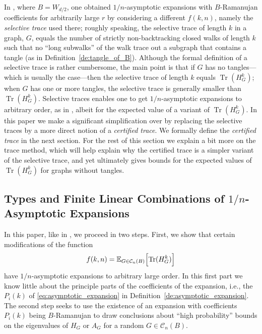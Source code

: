 \documentclass{memo-l}
\theoremstyle{plain}
\theoremstyle{definition}
\numberwithin{section}{chapter}
\numberwithin{equation}{chapter}
\newcommand{\cal}{\mathcal}
\newcommand{\cc}{{\cal C}}
\DeclareMathOperator{\Tr}{Tr}
\theoremstyle{plain}
\theoremstyle{definition}
\newcommand\EE{\mathbb{E}}
\newcommand\cC{\mathcal{C}}
\begin{document}
In \cite{friedman_alon}, 
where $B=W_{d/2}$,
one obtained $1/n$-asymptotic expansions with $B$-Ramanujan coefficients
for arbitrarily large $r$
by considering a different $f(k,n)$, namely the {\em selective trace}
used there; roughly speaking, the selective trace of length $k$
in a graph, $G$, equals the number of strictly non-backtracking closed
walks of length $k$ such that no ``long subwalks'' of the walk trace
out a subgraph that contains a tangle (as in
Definition~\ref{de:tangle_of_B}).
Although the formal definition of a selective trace is rather
cumbersome, the main point is that if $G$ has no tangles---which is
usually the case---then the selective trace of length $k$ equals
$\Tr(H_G^k)$;
when $G$ has one or more tangles,
the selective trace is generally smaller than $\Tr(H_G^k)$.
Selective traces enables
one to get $1/n$-asymptotic expansions to arbitrary order,
as in \cite{friedman_alon}, albeit for the expected value of a
variant of $\Tr(H_G^k)$.
In this paper we make a significant simplification over \cite{friedman_alon}
by replacing the selective traces by a more direct notion of a
{\em certified trace}.
We formally define the {\em certified trace} in the next section.
For the rest of this section we explain a bit more on the trace method,
which will help explain why the certified trace is a simpler variant
of the selective trace, and yet ultimately gives bounds for
the expected values of $\Tr(H_G^k)$ for graphs without tangles.



\subsection{Types and Finite Linear Combinations of
$1/n$-Asymptotic Expansions}
\label{sb:rough_types}

In this paper, like in \cite{friedman_random_graphs,friedman_alon},
we proceed in two steps.  First, we show that certain modifications
of the function
$$
f(k,n) = 
\EE_{G\in\cc_n(B)}\Bigl[ \Tr(H_G^k) \Bigr] 
$$
have $1/n$-asymptotic expansions to arbitrary large order.  In this
first part we know little about the principle parts of the coefficients
of the expansion,
i.e., the $P_i(k)$ of \eqref{eq:asymptotic_expansion} in
Definition~\ref{de:asymptotic_expansion}.
The second step seeks to use the existence of an expansion with
coefficients
$P_i(k)$ being 
$B$-Ramanujan to draw conclusions about ``high probability''
bounds on the eigenvalues
of $H_G$ or $A_G$ for a random $G\in\cC_n(B)$.
\end{document}

